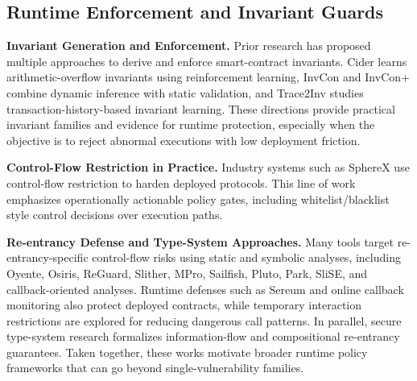 \subsection{Runtime Enforcement and Invariant Guards}

\noindent \textbf{Invariant Generation and Enforcement.}
Prior research has proposed multiple approaches to derive and enforce smart-contract invariants.
Cider\cite{liu2022learning} learns arithmetic-overflow invariants using reinforcement learning,
InvCon and InvCon+\cite{liu2022invcon,liu2024automated} combine dynamic inference with static validation,
and Trace2Inv\cite{chen2024demystifying} studies transaction-history-based invariant learning.
These directions provide practical invariant families and evidence for runtime protection,
especially when the objective is to reject abnormal executions with low deployment friction.

\noindent \textbf{Control-Flow Restriction in Practice.}
Industry systems such as SphereX use control-flow restriction to harden deployed protocols\cite{spherex}.
This line of work emphasizes operationally actionable policy gates,
including whitelist/blacklist style control decisions over execution paths.

\noindent \textbf{Re-entrancy Defense and Type-System Approaches.}
Many tools target re-entrancy-specific control-flow risks using static and symbolic analyses,
including Oyente, Osiris, ReGuard, Slither, MPro, Sailfish, Pluto, Park, SliSE,
and callback-oriented analyses\cite{luu2016making,torres2018osiris,liu2018reguard,feist2019slither,zhang2019mpro,bose2022sailfish,ma2021pluto,zheng2022park,wang2024efficiently,albert2020taming}.
Runtime defenses such as Sereum and online callback monitoring also protect deployed contracts\cite{rodler2018sereum,grossman2017online},
while temporary interaction restrictions are explored for reducing dangerous call patterns\cite{callens2024temporarily}.
In parallel, secure type-system research formalizes information-flow and compositional re-entrancy guarantees\cite{cecchetti2020securing,cecchetti2021compositional}.
Taken together, these works motivate broader runtime policy frameworks that can go beyond single-vulnerability families.
